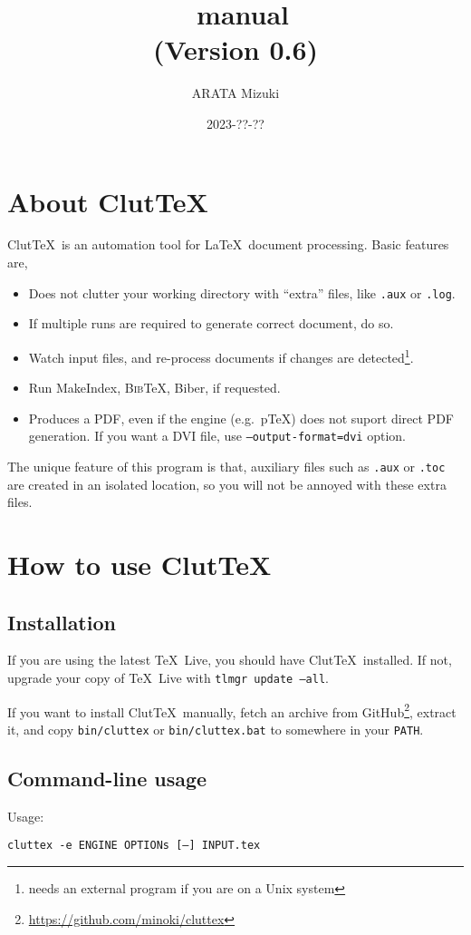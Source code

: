 \documentclass[a4paper]{report}
\title{\ClutTeX\ manual\\(Version 0.6)}
\author{ARATA Mizuki}
\date{2023-??-??}
\newcommand\ClutTeX{Clut\TeX}
\providecommand\BibTeX{\textsc{Bib}\TeX}
\newcommand\metavar[1]{\textnormal{\textsf{#1}}}
\begin{document}
\maketitle
\tableofcontents

\chapter{About \ClutTeX}
\ClutTeX\ is an automation tool for \LaTeX\ document processing.
Basic features are,
\begin{itemize}
\item Does not clutter your working directory with ``extra'' files, like \texttt{.aux} or \texttt{.log}.
\item If multiple runs are required to generate correct document, do so.
\item Watch input files, and re-process documents if changes are detected\footnote{needs an external program if you are on a Unix system}.
\item Run MakeIndex, \BibTeX, Biber, if requested.
\item Produces a PDF, even if the engine (e.g.\ p\TeX) does not suport direct PDF generation.
  If you want a DVI file, use \texttt{--output-format=dvi} option.
\end{itemize}

The unique feature of this program is that, auxiliary files such as \texttt{.aux} or \texttt{.toc} are created in an isolated location, so you will not be annoyed with these extra files.


\chapter{How to use \ClutTeX}
\section{Installation}
If you are using the latest \TeX\ Live, you should have \ClutTeX\ installed.
If not, upgrade your copy of \TeX\ Live with \texttt{tlmgr update --all}.

If you want to install \ClutTeX\ manually, fetch an archive from GitHub\footnote{\url{https://github.com/minoki/cluttex}}, extract it, and copy \texttt{bin/cluttex} or \texttt{bin/cluttex.bat} to somewhere in your \texttt{PATH}.

\section{Command-line usage}
Usage:
\begin{center}
  \texttt{cluttex -e \metavar{ENGINE} \metavar{OPTIONs} [--] \metavar{INPUT}.tex}
\end{center}
\end{document}
